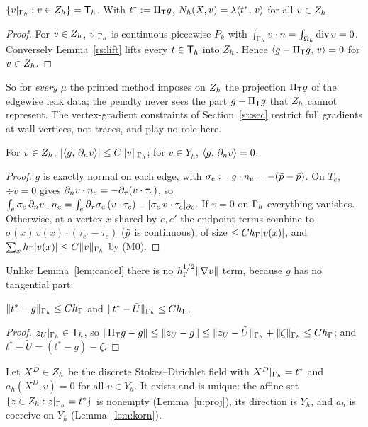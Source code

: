\begin{lemma}\label{u:proj}
$\{v|_{\Gamma_h}:v\in Z_h\}=\mathsf T_h$. With $t^\ast:=\Pi_{\mathsf T} g$, $N_h(X,v)=\lambda\langle t^\ast,\, v\rangle$ for all $v\in Z_h$.
\end{lemma}

\begin{proof}
For $v\in Z_h$, $v|_{\Gamma_h}$ is continuous piecewise $P_k$ with $\int_{\Gamma_h}v\cdot n=\int_{\Omega_h}\operatorname{div} v=0$. Conversely Lemma~\ref{rs:lift} lifts every $t\in\mathsf T_h$ into $Z_h$. Hence $\langle g-\Pi_{\mathsf T} g,\, v\rangle=0$ for $v\in Z_h$.
\end{proof}

So for \emph{every} $\mu$ the printed method imposes on $Z_h$ the projection $\Pi_{\mathsf T} g$ of the edgewise leak data; the penalty never sees the part $g-\Pi_{\mathsf T} g$ that $Z_h$ cannot represent. The vertex-gradient constraints of Section~\ref{st:sec} restrict full gradients at wall vertices, not traces, and play no role here.

\begin{lemma}\label{u:canc}
For $v\in Z_h$, $|\langle g,\, \partial_n v\rangle|\le C\lVert v\rVert_{\Gamma_h}$; for $v\in Y_h$, $\langle g,\, \partial_n v\rangle=0$.
\end{lemma}

\begin{proof}
$g$ is exactly normal on each edge, with $\sigma_e:=g\cdot n_e=-(\tilde p-\bar p)$. On $T_e$, $\div v=0$ gives $\partial_n v\cdot n_e=-\partial_\tau(v\cdot\tau_e)$, so $\int_e\sigma_e\,\partial_n v\cdot n_e=\int_e\partial_\tau\sigma_e\,(v\cdot\tau_e)-[\sigma_e\,v\cdot\tau_e]_{\partial e}$. If $v=0$ on $\Gamma_h$ everything vanishes. Otherwise, at a vertex $x$ shared by $e,e'$ the endpoint terms combine to $\sigma(x)\,v(x)\cdot(\tau_{e'}-\tau_e)$ ($\tilde p$ is continuous), of size $\le Ch_\Gamma|v(x)|$, and $\sum_xh_\Gamma|v(x)|\le C\lVert v\rVert_{\Gamma_h}$ by (M0).
\end{proof}

Unlike Lemma~\ref{lem:cancel} there is no $h_\Gamma^{1/2}\lVert \nabla v\rVert$ term, because $g$ has no tangential part.

\begin{lemma}\label{u:size}
$\lVert t^\ast-g\rVert_{\Gamma_h}\le Ch_\Gamma$ and $\lVert t^\ast-\tilde U\rVert_{\Gamma_h}\le Ch_\Gamma$.
\end{lemma}

\begin{proof}
$z_U|_{\Gamma_h}\in\mathsf T_h$, so $\lVert \Pi_{\mathsf T} g-g\rVert\le\lVert z_U-g\rVert\le\lVert z_U-\tilde U\rVert_{\Gamma_h}+\lVert \zeta\rVert_{\Gamma_h}\le Ch_\Gamma$; and $t^\ast-\tilde U=(t^\ast-g)-\zeta$.
\end{proof}

Let $X^D\in Z_h$ be the discrete Stokes--Dirichlet field with $X^D|_{\Gamma_h}=t^\ast$ and $a_h(X^D,v)=0$ for all $v\in Y_h$. It exists and is unique: the affine set $\{z\in Z_h:z|_{\Gamma_h}=t^\ast\}$ is nonempty (Lemma~\ref{u:proj}), its direction is $Y_h$, and $a_h$ is coercive on $Y_h$ (Lemma~\ref{lem:korn}).

